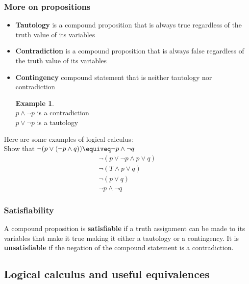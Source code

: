 \documentclass{article}
\theoremstyle{definition}
\newtheorem{example}{Example}
\begin{document}
\subsubsection{More on propositions}

\begin{tcolorbox}
\begin{itemize}
    \item \textbf{Tautology} is a compound proposition that is always true regardless of the truth value of its variables
    \item \textbf{Contradiction} is a compound proposition that is always false regardless of the truth value of its variables 
    \item \textbf{Contingency} compound statement that is neither tautology nor contradiction
    
    \begin{example}
    \\
    $p \land \neg p$ is a contradiction
    \\
    $p \lor \neg p$ is a tautology
    \end{example}
\end{itemize}
\end{tcolorbox}

Here are some examples of logical calculus:
\\
Show that $\neg(p \lor (\neg p \land q )) \equiveq \neg p \land \neg q$
\begin{align*}
    \neg(p\lor\neg p \land p \lor q)\\
    \neg(T \land p \lor q)\\
    \neg(p \lor q)\\
    \neg p \land \neg q
\end{align*}

\subsubsection{Satisfiability}

A compound proposition is \textbf{satisfiable} if a truth assignment can be made to its variables that make it true making it either a tautology or a contingency. It is \textbf{unsatisfiable} if the negation of the compound statement is a contradiction. 

\subsection{Logical calculus and useful equivalences}
\end{document}

